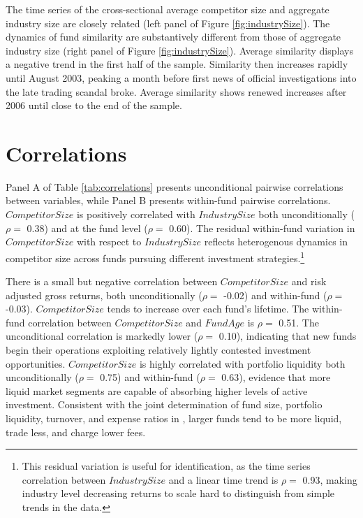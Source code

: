 \documentclass[openany]{book}
\let\rmarkdownfootnote\footnote%
\def\footnote{\protect\rmarkdownfootnote}
\theoremstyle{definition}
\theoremstyle{definition}
\theoremstyle{definition}
\theoremstyle{remark}
\begin{document}
The time series of the cross-sectional average competitor size and
aggregate industry size are closely related (left panel of Figure
\ref{fig:industrySize}). The dynamics of fund similarity are
substantively different from those of aggregate industry size (right
panel of Figure \ref{fig:industrySize}). Average similarity displays a
negative trend in the first half of the sample. Similarity then
increases rapidly until August 2003, peaking a month before first news
of official investigations into the late trading scandal broke. Average
similarity shows renewed increases after 2006 until close to the end of
the sample.

\section{Correlations}\label{correlations}

Panel A of Table \ref{tab:correlations} presents unconditional pairwise
correlations between variables, while Panel B presents within-fund
pairwise correlations. \(CompetitorSize\) is positively correlated with
\(IndustrySize\) both unconditionally (\(\rho=\) 0.38) and at the fund
level (\(\rho=\) 0.60). The residual within-fund variation in
\(CompetitorSize\) with respect to \(IndustrySize\) reflects
heterogenous dynamics in competitor size across funds pursuing different
investment strategies.\footnote{This residual variation is useful for
  identification, as the time series correlation between
  \(IndustrySize\) and a linear time trend is \(\rho=\) 0.93, making
  industry level decreasing returns to scale hard to distinguish from
  simple trends in the data.}

There is a small but negative correlation between \(CompetitorSize\) and
risk adjusted gross returns, both unconditionally (\(\rho=\) -0.02) and
within-fund (\(\rho=\) -0.03). \(CompetitorSize\) tends to increase over
each fund's lifetime. The within-fund correlation between
\(CompetitorSize\) and \(FundAge\) is \(\rho=\) 0.51. The unconditional
correlation is markedly lower (\(\rho=\) 0.10), indicating that new
funds begin their operations exploiting relatively lightly contested
investment opportunities. \(CompetitorSize\) is highly correlated with
portfolio liquidity both unconditionally (\(\rho=\) 0.75) and
within-fund (\(\rho=\) 0.63), evidence that more liquid market segments
are capable of absorbing higher levels of active investment. Consistent
with the joint determination of fund size, portfolio liquidity,
turnover, and expense ratios in \citet{pst17L}, larger funds tend to be
more liquid, trade less, and charge lower fees.
\end{document}
